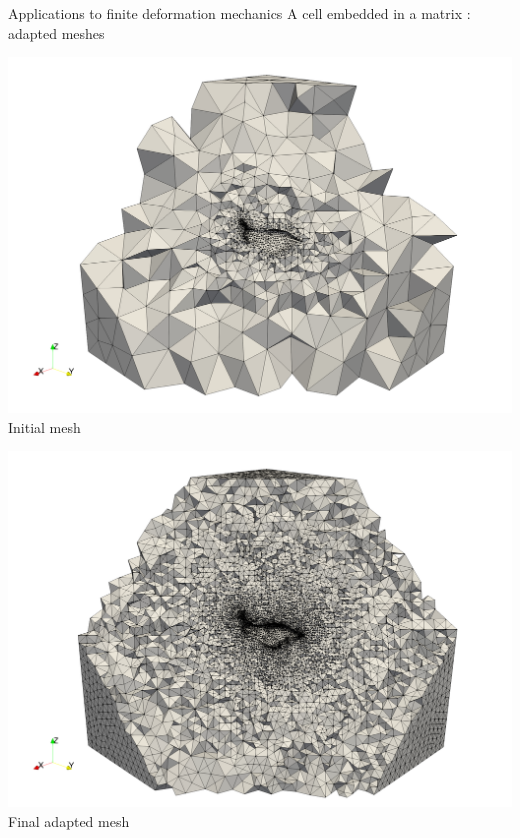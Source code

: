 \documentclass[fleqn]{beamer}
\begin{document}
\begin{frame}{Applications to finite deformation mechanics}
{A cell embedded in a matrix : adapted meshes}
\begin{minipage}{0.5\textwidth}
\hspace*{-3em}
\includegraphics[width=1.3\textwidth]{../img/mech_glial_initial_mesh} \\
Initial mesh
\end{minipage}%
\begin{minipage}{0.5\textwidth}
\centering
\hspace*{-1em}
\includegraphics[width=1.3\textwidth]{../img/mech_glial_final_mesh} \\
Final adapted mesh
\end{minipage}
\end{frame}
\end{document}
